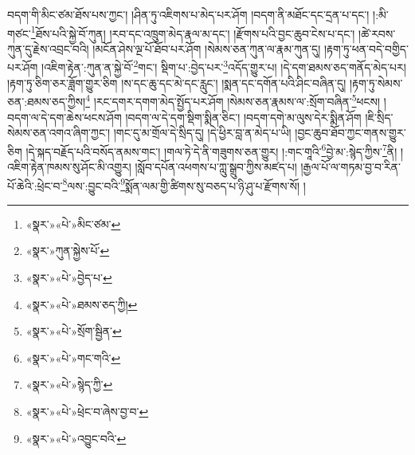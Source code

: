 བདག་གི་མིང་ཙམ་ཐོས་པས་ཀྱང་། །ཤིན་ཏུ་འཇིགས་པ་མེད་པར་ཤོག །བདག་ནི་མཐོང་དང་དྲན་པ་དང་། །:མི་གཙང་\footnote{«སྣར་»«པེ་»མིང་ཙམ་}ཐོས་པའི་སྐྱེ་བོ་ཀུན། །རབ་དང་འཁྲུག་མེད་རྣལ་མ་དང་། །རྫོགས་པའི་བྱང་ཆུབ་ངེས་པ་དང་། །ཚེ་རབས་ཀུན་དུ་རྗེས་འབྲང་བའི། །མངོན་ཤེས་ལྔ་པོ་ཐོབ་པར་ཤོག །སེམས་ཅན་ཀུན་ལ་རྣམ་ཀུན་དུ། །རྟག་ཏུ་ཕན་བདེ་བགྱིད་པར་ཤོག །འཇིག་རྟེན་:ཀུན་ན་སྐྱེ་བོ་\footnote{«སྣར་»ཀུན་སྐྱེས་པོ་}གང་། སྡིག་པ་:བྱེད་པར་\footnote{«སྣར་»«པེ་»བྱེད་པ་}འདོད་གྱུར་པ། །དེ་དག་ཐམས་ཅད་གནོད་མེད་པར། །རྟག་ཏུ་ཅིག་ཅར་ཟློག་གྱུར་ཅིག །ས་དང་ཆུ་དང་མེ་དང་རླུང་། །སྨན་དང་དགོན་པའི་ཤིང་བཞིན་དུ། །རྟག་ཏུ་སེམས་ཅན་:ཐམས་ཅད་ཀྱིས།\footnote{«སྣར་»«པེ་»ཐམས་ཅད་ཀྱི།} །རང་དགར་དགག་མེད་སྤྱོད་པར་ཤོག །སེམས་ཅན་རྣམས་ལ་:སྲོག་བཞིན་\footnote{«སྣར་»«པེ་»སྲོག་སྦྱིན་}ཕངས། །བདག་ལ་དེ་དག་ཆེས་ཕངས་ཤོག །བདག་ལ་དེ་དག་སྡིག་སྨིན་ཅིང་། །བདག་དགེ་མ་ལུས་དེར་སྨིན་ཤོག །ཇི་སྲིད་སེམས་ཅན་འགའ་ཞིག་ཀྱང་། །གང་དུ་མ་གྲོལ་དེ་སྲིད་དུ། །དེ་ཕྱིར་བླ་ན་མེད་པ་ཡི། །བྱང་ཆུབ་ཐོབ་ཀྱང་གནས་གྱུར་ཅིག །དེ་སྐད་བརྗོད་པའི་བསོད་ནམས་གང་། །གལ་ཏེ་དེ་ནི་གཟུགས་ཅན་གྱུར། །:གང་གཱའི་\footnote{«སྣར་»«པེ་»གང་གའི་}བྱེ་མ་:སྙེད་ཀྱིས་\footnote{«སྣར་»«པེ་»སྙེད་ཀྱི་}ནི། །འཇིག་རྟེན་ཁམས་སུ་ཤོང་མི་འགྱུར། །སློབ་དཔོན་འཕགས་པ་ཀླུ་སྒྲུབ་ཀྱིས་མཛད་པ། །རྒྱལ་པོ་ལ་གཏམ་བྱ་བ་རིན་པོ་ཆེའི་:ཕྲེང་བ་\footnote{«སྣར་»«པེ་»ཕྲེང་བ་ཞེས་བྱ་བ་}ལས་:བྱུང་བའི་\footnote{«སྣར་»«པེ་»འབྱུང་བའི་}སྨོན་ལམ་གྱི་ཚིགས་སུ་བཅད་པ་ཉི་ཤུ་པ་རྫོགས་སོ། ། 